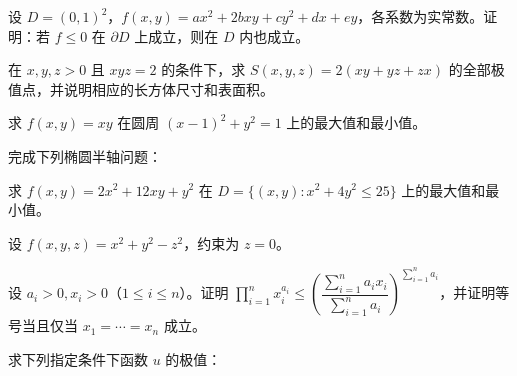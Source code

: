 \noindent\begin{minipage}{\textwidth}
设 $D=(0,1)^2$，$f(x,y)=ax^2+2bxy+cy^2+dx+ey$，各系数为实常数。证明：若 $f\le0$ 在 $\partial D$ 上成立，则在 $D$ 内也成立。
\end{minipage}\par\vfill
\newpage
\noindent\begin{minipage}{\textwidth}
在 $x,y,z>0$ 且 $xyz=2$ 的条件下，求 $S(x,y,z)=2(xy+yz+zx)$ 的全部极值点，并说明相应的长方体尺寸和表面积。
\end{minipage}\par\vfill
\noindent\begin{minipage}{\textwidth}
求 $f(x,y)=xy$ 在圆周 $(x-1)^2+y^2=1$ 上的最大值和最小值。
\end{minipage}\par\vfill
\noindent\begin{minipage}{\textwidth}
完成下列椭圆半轴问题：
\end{minipage}\par\vfill
\newpage
\noindent\begin{minipage}{\textwidth}
求 $f(x,y)=2x^2+12xy+y^2$ 在 $D=\{(x,y):x^2+4y^2\le25\}$ 上的最大值和最小值。
\end{minipage}\par\vfill
\noindent\begin{minipage}{\textwidth}
设 $f(x,y,z)=x^2+y^2-z^2$，约束为 $z=0$。
\end{minipage}\par\vfill
\noindent\begin{minipage}{\textwidth}
设 $a_i>0,x_i>0$（$1\le i\le n$）。证明 $\prod_{i=1}^n x_i^{a_i}\le\left(\dfrac{\sum_{i=1}^n a_ix_i}{\sum_{i=1}^n a_i}\right)^{\sum_{i=1}^n a_i}$，并证明等号当且仅当 $x_1=\cdots=x_n$ 成立。
\end{minipage}\par\vfill
\newpage
\noindent\begin{minipage}{\textwidth}
求下列指定条件下函数 $u$ 的极值：
\end{minipage}\par\vfill
